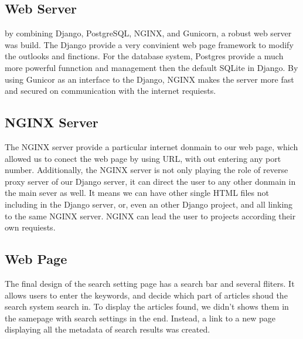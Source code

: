 \subsection{Web Server}
by combining Django, PostgreSQL, NGINX, and Gunicorn, a robust web server was build.
The Django provide a very convinient web page framework to modify the outlooks and finctions. 
For the database system, Postgres provide a much more powerful funnction and management then the default SQLite in Django.
By using Gunicor as an interface to the Django, NGINX makes the server more  fast and secured on communication with the internet requiests.

\subsection{NGINX Server}
The NGINX server provide a particular internet donmain to our web page,
which allowed us to conect the web page by using URL,
with out entering any port number. Additionally,
the NGINX server is not only playing the role of reverse proxy server of our Django server,
it can direct the user to any other donmain in the main sever as well.
It means we can have other single HTML files not including in the Django server, or,
even an other Django project, and all linking to the same NGINX server.
NGINX can lead the user to projects according their own requiests. 

\subsection{Web Page}
The final design of the search setting page has a search bar and several fliters.
It allows users to enter the keywords, and decide which part of articles shoud the search system search in.
To display the articles found, we didn't shows them in the samepage with search settings in the end. Instead, a link to a new page displaying all the metadata of search results was created.
